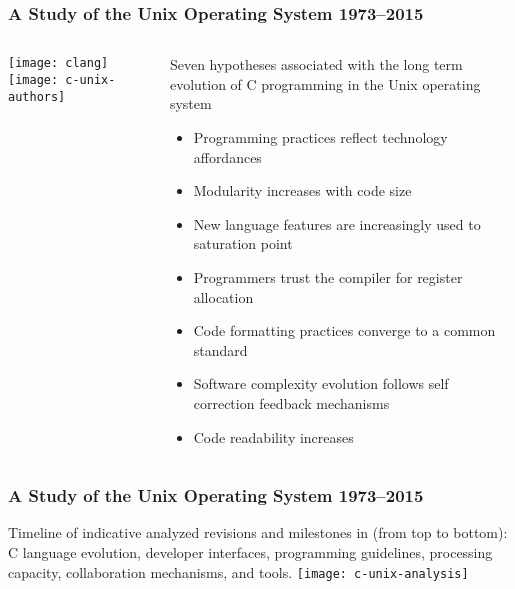 \begin{frame}[plain]
	\frametitle{A Study of the Unix Operating System 1973–2015}
	
	
	
	\begin{columns}
		
		\begin{column}{.3\textwidth}
			
			\texttt{[image: clang]}
			\texttt{[image: c-unix-authors]}
		\end{column}
		
		\begin{column}{.7\textwidth}
			
			
			Seven hypotheses associated with the long term evolution of C programming in		the Unix operating system
			
			\begin{itemize}
				\item  Programming practices reflect technology affordances
				
				\item  Modularity increases with code size
				
				\item  New language features are increasingly used
				to saturation point
				
				
				\item  Programmers trust the compiler for register
				allocation
				
				\item Code formatting practices converge to a common standard
				
				\item  Software complexity evolution follows self correction feedback mechanisms
				
				\item Code readability increases
				
			\end{itemize}
			
		\end{column}
		
		
	\end{columns}
	
	
\end{frame}


\begin{frame}[plain]
	\frametitle{A Study of the Unix Operating System 1973–2015}
	Timeline of indicative analyzed revisions and milestones in (from top to bottom): C language evolution, developer interfaces, programming guidelines, processing capacity, collaboration mechanisms, and tools.
	\texttt{[image: c-unix-analysis]}
	
\end{frame}	


